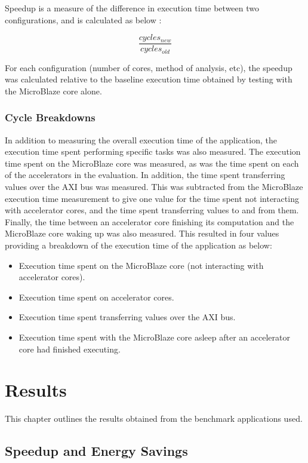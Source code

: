 \documentclass{UoYCSproject}
\begin{document}
Speedup is a measure of the difference in execution time between two configurations, and is calculated as below
\cite{computer-arch}:

\[\frac{cycles_{new}}{cycles_{old}}\]

For each configuration (number of cores, method of analysis, etc), the speedup was calculated relative to the baseline execution
time obtained by testing with the MicroBlaze core alone.

\subsection{Cycle Breakdowns}

In addition to measuring the overall execution time of the application, the execution time spent performing
specific tasks was also measured. The execution time spent on the MicroBlaze core was measured, as was the time spent
on each of the accelerators in the evaluation. In addition, the time spent transferring values over the AXI bus was
measured. This was subtracted from the MicroBlaze execution time measurement to give one value for the time spent not
interacting with accelerator cores, and the time spent transferring values to and from them. Finally, the time
between an accelerator core finishing its computation and the MicroBlaze core waking up was also measured.
This resulted in four values providing a breakdown of the execution time of the application as below:

\begin{itemize}
  \item Execution time spent on the MicroBlaze core (not interacting with accelerator cores).
  \item Execution time spent on accelerator cores.
  \item Execution time spent transferring values over the AXI bus.
  \item Execution time spent with the MicroBlaze core asleep after an accelerator core had finished executing.
\end{itemize}

\chapter{Results}

This chapter outlines the results obtained from the benchmark applications used.

\section{Speedup and Energy Savings}
\end{document}
